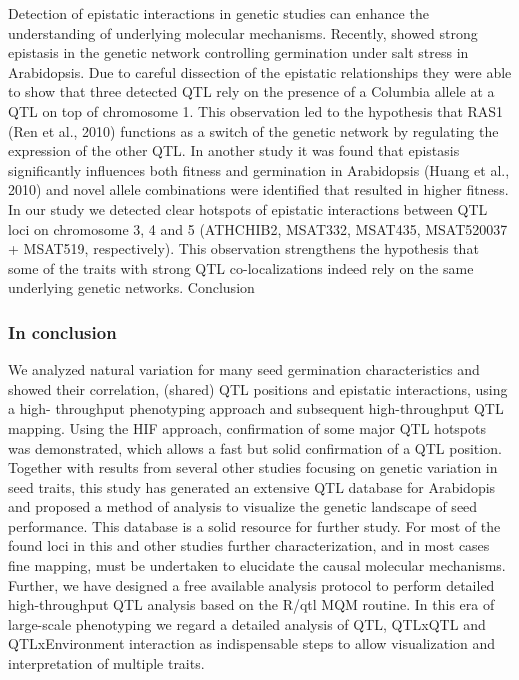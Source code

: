 \documentclass[8pt, twoside, a5paper]{report}
\begin{document}
Detection of epistatic interactions in genetic studies can enhance the understanding of underlying molecular mechanisms. Recently, \cite{Galpaz:2010} showed strong epistasis 
in the genetic network controlling germination under salt stress in Arabidopsis. Due to careful dissection of the epistatic relationships they were able to show that three detected 
QTL rely on the presence of a Columbia allele at a QTL on top of chromosome 1. This observation led to the hypothesis that RAS1 (Ren et al., 2010) functions as a switch of the genetic 
network by regulating the expression of the other QTL. In another study it was found that epistasis significantly influences both fitness and germination in Arabidopsis (Huang et al., 2010) 
and novel allele combinations were identified that resulted in higher fitness. In our study we detected clear hotspots of epistatic interactions between QTL loci on chromosome 3, 4 and 5 (ATHCHIB2,
MSAT332, MSAT435, MSAT520037 + MSAT519, respectively). This observation strengthens the hypothesis that some of the traits with strong QTL co-localizations indeed rely on the same underlying genetic networks.
Conclusion

\subsubsection{In conclusion}
We analyzed natural variation for many seed germination characteristics and showed their correlation, (shared) QTL positions and epistatic interactions, using a high-
throughput phenotyping approach and subsequent high-throughput QTL mapping. Using the HIF approach, confirmation of some major QTL hotspots was demonstrated, which 
allows a fast but solid confirmation of a QTL position. Together with results from several other studies focusing on genetic variation in seed traits, this study has 
generated an extensive QTL database for Arabidopis and proposed a method of analysis to visualize the genetic landscape of seed performance. This database is a solid 
resource for further study. For most of the found loci in this and other studies further characterization, and in most cases fine mapping, must be undertaken to elucidate 
the causal molecular mechanisms. Further, we have designed a free available analysis protocol to perform detailed high-throughput QTL analysis based on the R/qtl MQM 
routine. In this era of large-scale phenotyping we regard a detailed analysis of QTL, QTLxQTL and QTLxEnvironment interaction as indispensable steps to allow visualization 
and interpretation of multiple traits.
\end{document}
